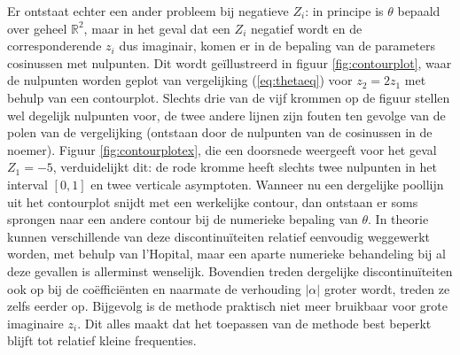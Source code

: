 \documentclass[12pt]{article}
\begin{document}
Er ontstaat echter een ander probleem bij negatieve \(Z_i\): in principe is \(\theta\) bepaald over geheel \(\mathbb{R}^2\), maar in het geval dat een \(Z_i\) negatief wordt en de corresponderende \(z_i\) dus imaginair, komen er in de bepaling van de parameters cosinussen met nulpunten. Dit wordt geïllustreerd in figuur \ref{fig:contourplot}, waar de nulpunten worden geplot van vergelijking (\ref{eq:thetaeq}) voor \(z_2=2z_1\) met behulp van een contourplot. Slechts drie van de vijf krommen op de figuur stellen wel degelijk nulpunten voor, de twee andere lijnen zijn fouten ten gevolge van de polen van de vergelijking (ontstaan door de nulpunten van de cosinussen in de noemer). Figuur \ref{fig:contourplotex}, die een doorsnede weergeeft voor het geval \(Z_1=-5\), verduidelijkt dit: de rode kromme heeft slechts twee nulpunten in het interval \([0,1]\) en twee verticale asymptoten. Wanneer nu een dergelijke poollijn uit het contourplot snijdt met een werkelijke contour, dan ontstaan er soms sprongen naar een andere contour bij de numerieke bepaling van \(\theta\). In theorie kunnen verschillende van deze discontinuïteiten relatief eenvoudig weggewerkt worden, met behulp van l'Hopital, maar een aparte numerieke behandeling bij al deze gevallen is allerminst wenselijk. Bovendien treden dergelijke discontinuïteiten ook op bij de coëfficiënten en naarmate de verhouding \(|\alpha|\) groter wordt, treden ze zelfs eerder op. Bijgevolg is de methode praktisch niet meer bruikbaar voor grote imaginaire \(z_i\). Dit alles maakt dat het toepassen van de methode best beperkt blijft tot relatief kleine frequenties.
\end{document}
